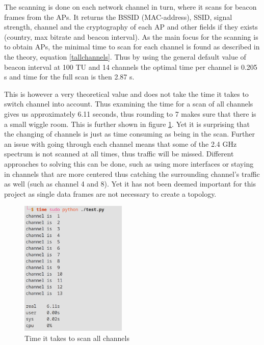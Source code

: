 The scanning is done on each network channel in turn, where it scans for beacon frames from the APs. It returns the BSSID (MAC-address), SSID, signal strength, channel and the cryptography of each AP and other fields if they exists (country, max bitrate and beacon interval). As the main focus for the scanning is to obtain APs, the minimal time to scan for each channel is found as described in the theory, equation \ref{tallchannels}. Thus by using the general default value of beacon interval at 100 TU and 14 channels the optimal time per channel is 0.205 s and time for the full scan is then 2.87 s.  

This is however a very theoretical value and does not take the time it takes to switch channel into account. Thus examining the time for a scan of all channels gives us approximately 6.11 seconds, thus rounding to 7 makes sure that there is a small wiggle room. This is further shown in figure \ref{timne_to_scan}. Yet it is surprising that the changing of channels is just as time consuming as being in the scan. Further an issue with going through each channel means that some of the 2.4 GHz spectrum is not scanned at all times, thus traffic will be missed. Different approaches to solving this can be done, such as using more interfaces or staying in channels that are more centered thus catching the surrounding channel's traffic as well (such as channel 4 and 8). Yet it has not been deemed important for this project as single data frames are not necessary to create a topology. 

\begin{figure}[!htbp]
    \centering
    \includegraphics[width=0.45\textwidth]{Latex-Files/Billeder/Implementation/time_to_scan.png}
    \caption{Time it takes to scan all channels}
    \label{timne_to_scan}
\end{figure}
 
